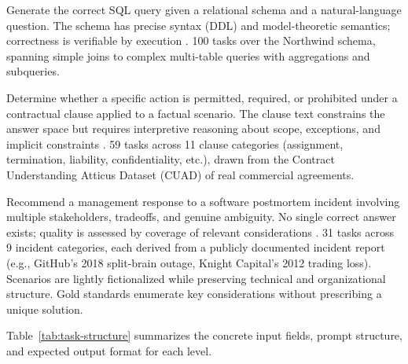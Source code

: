 \documentclass[runningheads]{llncs}
\begin{document}
\begin{description}[style=nextline]
  \item[High-formal (SQL generation)]
    Generate the correct SQL query given a relational schema and a natural-language question. The schema has precise syntax (DDL) and model-theoretic semantics; correctness is verifiable by execution \cite{olive2007conceptual,chen2021evaluating}. 100 tasks over the Northwind schema, spanning simple joins to complex multi-table queries with aggregations and subqueries.

  \item[Semi-formal (Legal clause interpretation)]
    Determine whether a specific action is permitted, required, or prohibited under a contractual clause applied to a factual scenario. The clause text constrains the answer space but requires interpretive reasoning about scope, exceptions, and implicit constraints \cite{mylopoulos1992conceptual}. 59 tasks across 11 clause categories (assignment, termination, liability, confidentiality, etc.), drawn from the Contract Understanding Atticus Dataset (CUAD) of real commercial agreements.

  \item[Low-formal (Management decision-making)]
    Recommend a management response to a software postmortem incident involving multiple stakeholders, tradeoffs, and genuine ambiguity. No single correct answer exists; quality is assessed by coverage of relevant considerations \cite{mylopoulos1992conceptual}. 31 tasks across 9 incident categories, each derived from a publicly documented incident report (e.g., GitHub's 2018 split-brain outage, Knight Capital's 2012 trading loss). Scenarios are lightly fictionalized while preserving technical and organizational structure. Gold standards enumerate key considerations without prescribing a unique solution.
\end{description}

\noindent Table~\ref{tab:task-structure} summarizes the concrete input fields, prompt structure, and expected output format for each level.
\end{document}
